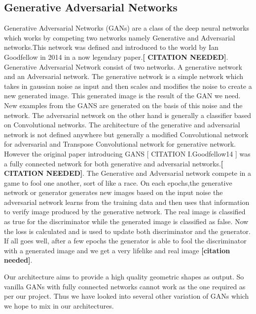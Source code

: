 \documentclass{article}
\begin{document}
\subsection{Generative Adversarial Networks}
Generative Adversarial Networks (GANs) are a class of the deep neural networks which works by competing two networks namely Generative and Adversarial networks.This network was defined and introduced to the world by Ian Goodfellow in 2014 in a now legendary paper.\textbf{[ CITATION NEEDED]}. Generative Adversarial Network consist of two networks. A generative network and an Adversarial network. The generative network is a simple network which takes in gaussian noise as input and then scales and modifies the noise to create a new generated image. This generated image is the result of the GAN we need. New examples from the GANS are generated on the basis of this noise and the network. The adversarial network on the other hand is generally a classifier based on Convolutional networks. The architecture of the generative and adversarial network is not defined anywhere but generally a modified Convolutional network for adversarial and Transpose Convolutional network for generative network. However the original paper introducing GANS [ CITATION I.Goodfellow14 ] was a fully connected network for both generative and adversarial networks.\textbf{[ CITATION NEEDED]}.
The Generative and Adversarial network compete in a game to fool one another, sort of like a race. On each epochs,the generative network or generator generates new images based on the input noise  the adversarial network learns from the training data and then uses that information to verify image produced by the generative network. The real image is classified as true for the discriminator while the generated image is classified as false. Now the loss is calculated and is used to update both discriminator and the generator. If all goes well, after a few epochs the generator is able to fool the discriminator with a generated image and we get a very lifelike and real image \textbf{[citation needed]}.
 
Our architecture aims to provide a high quality geometric shapes as output. So vanilla GANs with fully connected networks cannot work as the one required as per our project. Thus we have looked into several other variation of GANs which we hope to mix in our architectures.
\end{document}
